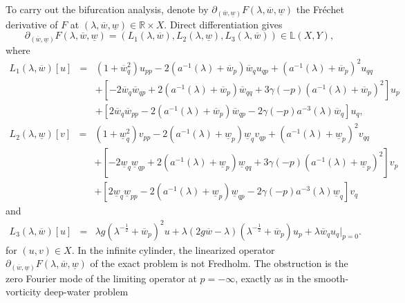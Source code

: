 \documentclass[11pt,reqno]{amsart}
\numberwithin{equation}{section}
\theoremstyle{definition}
\theoremstyle{remark}
\begin{document}
To carry out the bifurcation analysis, denote by
$\partial_{(\overline{w},\underline{w})}F(\lambda,
\overline{w},\underline{w})$ the Fr\'{e}chet derivative of $F$ at
$(\lambda,\overline{w},\underline{w})\in \mathbb{R}\times X$.
Direct differentiation gives
$$
\partial_{(\overline{w},\underline{w})}F(\lambda, \overline{w},\underline{w})=(L_1(\lambda,\overline{w}), L_2(\lambda,\underline{w}), L_3(\lambda,\overline{w}))\in \mathbb{L}(X, Y),
$$
where
\begin{eqnarray}
L_1(\lambda,\overline{w})[u]&=&\left(1+\overline{w}_q^2\right)u_{pp}-2\left(a^{-1}(\lambda)+\overline{w}_p\right)\overline{w}_qu_{qp}+\left(a^{-1}(\lambda)+\overline{w}_p\right)^2u_{qq} \nonumber\\
&~&+\left[ -2\overline{w}_q\overline{w}_{qp}+2\left(a^{-1}(\lambda)+\overline{w}_p\right)\overline{w}_{qq}+3\gamma(-p)\left(a^{-1}(\lambda)+\overline{w}_p\right)^2 \right]u_p \nonumber\\
&~&+\left[
2\overline{w}_q\overline{w}_{pp}-2\left(a^{-1}(\lambda)+\overline{w}_p\right)\overline{w}_{qp}-2\gamma(-p)a^{-3}(\lambda)\overline{w}_q
\right]u_q, \label{eq4.6}
\end{eqnarray}
\begin{eqnarray}
L_2(\lambda,\underline{w})[v]&=&\left(1+\underline{w}_q^2\right)v_{pp}-2\left(a^{-1}(\lambda)+\underline{w}_p\right)\underline{w}_qv_{qp}+\left(a^{-1}(\lambda)+\underline{w}_p\right)^2v_{qq} \nonumber\\
&~&+\left[ -2\underline{w}_q\underline{w}_{qp}+2\left(a^{-1}(\lambda)+\underline{w}_p\right)\underline{w}_{qq}+3\gamma(-p)\left(a^{-1}(\lambda)+\underline{w}_p\right)^2 \right]v_p \nonumber\\
&~&+\left[
2\underline{w}_q\underline{w}_{pp}-2\left(a^{-1}(\lambda)+\underline{w}_p\right)\underline{w}_{qp}-2\gamma(-p)a^{-3}(\lambda)\underline{w}_q
\right]v_q \label{eq4.7}
\end{eqnarray}
and
\begin{eqnarray}
L_3(\lambda,\overline{w})[u]
&=&\lambda g\left(\lambda^{-\frac{1}{2}}+\overline{w}_p\right)^2u
+\lambda(2g\overline{w}-\lambda)
\left(\lambda^{-\frac{1}{2}}+\overline{w}_p\right)u_p
+\lambda\overline{w}_qu_q\Big|_{p=0}.
\label{eq4.8}
\end{eqnarray}
for $(u,v)\in X$. In the infinite cylinder, the linearized operator
$\partial_{(\overline{w},\underline{w})}F(\lambda,
\overline{w},\underline{w})$ of the exact problem is not Fredholm.
The obstruction is the zero Fourier mode of the limiting operator at
$p=-\infty$, exactly as in the smooth-vorticity deep-water problem
\end{document}
